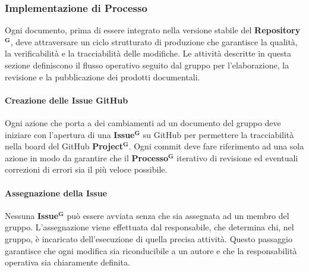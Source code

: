 \documentclass[a4paper,12pt]{article}
\newcommand{\term}[1]{\textbf{#1}$^\mathbf{G}$}
\newcommand{\ignoreglossary}{}
\begin{document}
\subsubsection{Implementazione di Processo}
Ogni documento, prima di essere integrato nella versione stabile del \term{Repository}, deve attraversare un ciclo strutturato di produzione che garantisce la qualità, la verificabilità e la tracciabilità delle modifiche. Le attività descritte in questa sezione definiscono il flusso operativo seguito dal gruppo per l’elaborazione, la revisione e la pubblicazione dei prodotti documentali.

\paragraph{Creazione delle \ignoreglossary{Issue} GitHub}
Ogni azione che porta a dei cambiamenti ad un documento del gruppo deve iniziare con l’apertura di una \term{Issue} su GitHub per permettere la tracciabilità nella board del GitHub \term{Project}. Ogni commit deve fare riferimento ad una sola azione in modo da garantire che il \term{Processo} iterativo di revisione ed eventuali correzioni di errori sia il più veloce possibile.

\paragraph{Assegnazione della \ignoreglossary{Issue}} 
Nessuna \term{Issue} può essere avviata senza che sia assegnata ad un membro del gruppo. L’assegnazione viene effettuata dal responsabile, che determina chi, nel gruppo, è incaricato dell’esecuzione di quella precisa attività. Questo passaggio garantisce che ogni modifica sia riconducibile a un autore e che la responsabilità operativa sia chiaramente definita.
\end{document}
